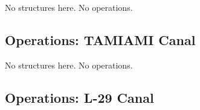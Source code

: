No structures here. No operations.

\subsection{Operations: TAMIAMI Canal}

No structures here. No operations.

\clearpage

\subsection{Operations: L-29 Canal}


